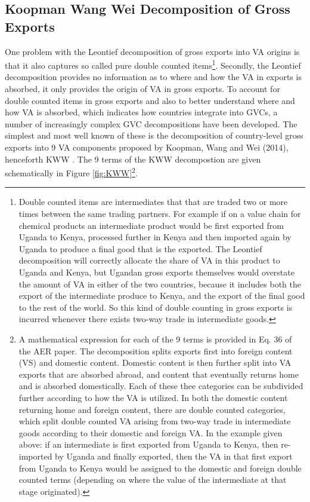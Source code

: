 \documentclass[a4paper]{article}
\begin{document}
\subsection{Koopman Wang Wei Decomposition of Gross Exports}
One problem with the Leontief decomposition of gross exports into VA origins is that it also captures so called pure double counted items\footnote{Double counted items are intermediates that that are traded two or more times between the same trading partners. For example if on a value chain for chemical products an intermediate product would be first exported from Uganda to Kenya, processed further in Kenya and then imported again by Uganda to produce a final good that is the exported. The Leontief decomposition will correctly allocate the share of VA in this product to Uganda and Kenya, but Ugandan gross exports themselves would overstate the amount of VA in either of the two countries, because it includes both the export of the intermediate produce to Kenya, and the export of the final good to the rest of the world. So this kind of double counting in gross exports is incurred whenever there exists two-way trade in intermediate goods.}. %
Secondly, the Leontief decomposition provides no information as to where and how the VA in exports is absorbed, it only provides the origin of VA in gross exports. To account for double counted items in gross exports and also to better understand where and how VA is absorbed, which indicates how countries integrate into GVCs, a number of increasingly complex GVC decompositions have been developed. The simplest and most well known of these is the decomposition of country-level gross exports into 9 VA components proposed by Koopman, Wang and Wei (2014), henceforth KWW \citep{koopman2014tracing}. The 9 terms of the KWW decompostion are given schematically in Figure \ref{fig:KWW}\footnote{A mathematical expression for each of the 9 terms is provided in Eq. 36 of the \citet{koopman2014tracing} AER paper. The decomposition splits exports first into foreign content (VS) and domestic content. Domestic content is then further split into VA exports that are absorbed abroad, and content that eventually returns home and is absorbed domestically. Each of these thee categories can be subdivided further according to how the VA is utilized. In both the domestic content returning home and foreign content, there are double counted categories, which split double counted VA arising from two-way trade in intermediate goods according to their domestic and foreign VA. In the example given above: if an intermediate is first exported from Uganda to Kenya, then re-imported by Uganda and finally exported, then the VA in that first export from Uganda to Kenya would be assigned to the domestic and foreign double counted terms (depending on where the value of the intermediate at that stage originated). }. \newline
\end{document}
